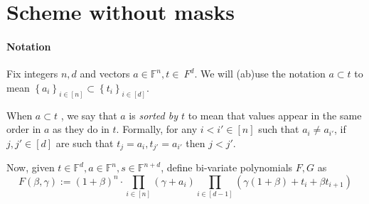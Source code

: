 \documentclass[11pt]{article} %
\newcommand{\F}{\ensuremath{\mathbb F}\xspace}
\newcommand{\defeq}{:=}
\newcommand{\sett}[2]{\ensuremath{\set{#1}_{#2}}\xspace}
\newcommand{\set}[1]{\ensuremath{\left\{#1\right\}}\xspace}
\begin{document}
\section{Scheme without masks}


\paragraph{Notation}

Fix integers $n,d$ and vectors $a\in \F^n, t\in\ F^d$.
We will (ab)use the notation $a\subset t$ to mean $\sett{a_i}{i\in [n]}\subset \sett{t_i}{i\in [d]}$.

When $a\subset t$ , we say that $a$ is \emph{sorted by $t$} to mean that values appear in the same order in $a$ as they do in $t$. Formally, for any $i<i'\in [n]$ such that $a_i\neq a_{i'}$, if $j,j'\in [d]$ are such that $t_{j} = a_i, t_{j'} =a_{i'}$ then $j<j'$.

Now, given $t\in \F^d, a\in \F^n, s\in \F^{n+d}$, define bi-variate polynomials $F,G$ as 
\[F(\beta,\gamma) \defeq (1+\beta)^n\cdot \prod_{i\in [n]} (\gamma + a_i) \prod_{i\in [d-1]} (\gamma(1+\beta) + t_i + \beta t_{i+1})\]
                                  
\end{document}

